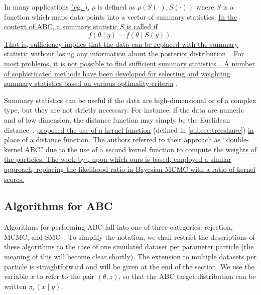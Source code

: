 In many applications {\color{blue}\uline{(eg. \autocite{fu1997estimating,
tanaka2006using})}}, $\rho$ is defined as $\rho(S(\cdot), S(\cdot))$ where $S$
is a function which maps data points into a vector of summary statistics.
{\color{blue}\uline{In the context of \gls{ABC}, a summary statistic $S$ is
called  if} 
\[
  f(\theta \mid y) = f(\theta \mid S(y)).
\]
\uline{That is, sufficiency implies that the data can be replaced with the
summary statistic without losing any information about the posterior
distribution~\autocite{marjoram2006modern}. For most problems, it is not
possible to find sufficient summary statistics~\autocite{marjoram2006modern}.
A number of sophisticated methods have been developed for selecting and
weighting summary statistics based on various optimality criteria}
\autocite[][and references therein]{aeschbacher2012novel,
blum2013comparative}}.

Summary statistics can be useful if the data are high-dimensional or of a
complex type, but they are not strictly necessary. For instance, if the data
are numeric and of low dimension, the distance function may simply be the
Euclidean distance~\autocite{sisson2007sequential}.
{\color{blue}\textcite{park2015k2} \uline{proposed the use of a kernel function}
(defined in \cref{subsec:treeshape}) \uline{in place of a distance function.
The authors referred to their approach as ``double-kernel \gls{ABC}'' due to
the use of a second kernel function to compute the weights of the particles.
The work by \textcite{poon2015phylodynamic}, upon which ours is based, employed
a similar approach, replacing the likelihood ratio in Bayesian \gls{MCMC} with
a ratio of kernel scores.}}

\subsection{Algorithms for ABC}
\label{subsec:abcalg}

Algorithms for performing \gls{ABC} fall into one of three categories:
rejection, \gls{MCMC}, and \gls{SMC}~\autocite{marin2012approximate}. To
simplify the notation, we shall restrict the descriptions of these algorithms
to the case of one simulated dataset per parameter particle (the meaning of
this will become clear shortly). The extension to multiple datasets per
particle is straightforward and will be given at the end of the section. We use
the variable $x$ to refer to the pair $(\theta, z)$, so that the \gls{ABC}
target distribution can be written $\pi_\varepsilon(x \mid y)$.

